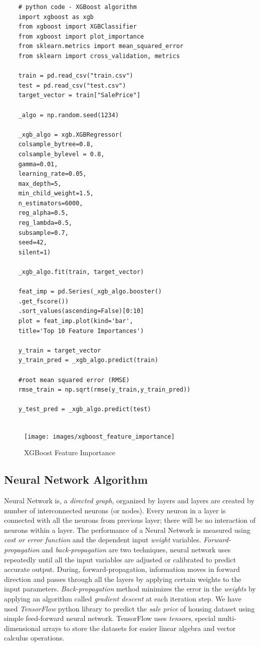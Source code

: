 \documentclass[sigconf]{acmart}
\begin{document}
	\begin{verbatim}
	# python code - XGBoost algorithm
	import xgboost as xgb
	from xgboost import XGBClassifier
	from xgboost import plot_importance
	from sklearn.metrics import mean_squared_error
	from sklearn import cross_validation, metrics
	
	train = pd.read_csv("train.csv")
	test = pd.read_csv("test.csv")
	target_vector = train["SalePrice"]
	
	_algo = np.random.seed(1234)
	
	_xgb_algo = xgb.XGBRegressor(
	colsample_bytree=0.8,
	colsample_bylevel = 0.8,
	gamma=0.01,
	learning_rate=0.05,
	max_depth=5,
	min_child_weight=1.5,
	n_estimators=6000,                                                                  
	reg_alpha=0.5,
	reg_lambda=0.5,
	subsample=0.7,
	seed=42,
	silent=1)
	
	_xgb_algo.fit(train, target_vector)   
	
	feat_imp = pd.Series(_xgb_algo.booster()
	.get_fscore())
	.sort_values(ascending=False)[0:10] 
	plot = feat_imp.plot(kind='bar', 
	title='Top 10 Feature Importances')
	
	y_train = target_vector
	y_train_pred = _xgb_algo.predict(train)
	
	#root mean squared error (RMSE)
	rmse_train = np.sqrt(rmse(y_train,y_train_pred))
	
	y_test_pred = _xgb_algo.predict(test)
	
	\end{verbatim}
	
	
	\begin{figure}[H]
		\centering
		\texttt{[image: images/xgboost\_feature\_importance]}	
		\caption{XGBoost Feature Importance} \label{fig:xgb_feature_imp} 
	\end{figure}
	
	
	\subsection{Neural Network Algorithm}
	Neural Network is, a {\em directed graph}, organized by layers and layers are created by number of interconnected neurons (or nodes). Every neuron in a layer is connected with all the neurons from previous layer; there will be no interaction of neurons within a layer. The performance of a Neural Network is measured using {\em cost or error function} and the dependent input {\em weight} variables. {\em Forward-propagation} and {\em back-propagation} are two techniques, neural network uses repeatedly until all the input variables are adjusted or calibrated to predict accurate output. During, forward-propagation, information moves in forward direction and passes through all the layers by applying certain weights to the input parameters. {\em Back-propagation} method minimizes the error in the {\em weights} by applying an algorithm called {\em gradient descent} at each iteration step. We have used {\em TensorFlow} python library to predict the {\em sale price} of housing dataset using simple feed-forward neural network. TensorFlow uses {\em tensors}, special multi-dimensional arrays to store the datasets for easier linear algebra and vector calculus operations.
		
\end{document}
